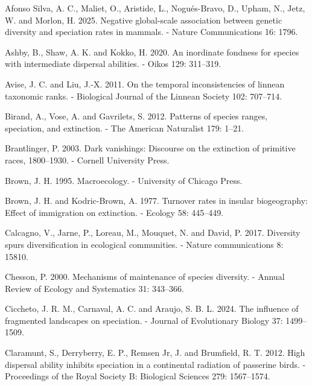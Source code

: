 \documentclass[
  letterpaper,
  DIV=11,
  numbers=noendperiod]{scrartcl}
\newlength{\cslhangindent}
\newenvironment{CSLReferences}[2] %
 {\begin{list}{}{%
  \setlength{\itemindent}{0pt}
  \setlength{\leftmargin}{0pt}
  \setlength{\parsep}{0pt}
  \ifodd #1
   \setlength{\leftmargin}{\cslhangindent}
   \setlength{\itemindent}{-1\cslhangindent}
  \fi
  \setlength{\itemsep}{#2\baselineskip}}}
 {\end{list}}
\begin{document}
\label{refs}
\begin{CSLReferences}{1}{1}
Afonso Silva, A. C., Maliet, O., Aristide, L., Nogués-Bravo, D., Upham,
N., Jetz, W. and Morlon, H. 2025. Negative global-scale association
between genetic diversity and speciation rates in mammals. - Nature
Communications 16: 1796.

Ashby, B., Shaw, A. K. and Kokko, H. 2020. An inordinate fondness for
species with intermediate dispersal abilities. - Oikos 129: 311--319.

Avise, J. C. and Liu, J.-X. 2011. On the temporal inconsistencies of
linnean taxonomic ranks. - Biological Journal of the Linnean Society
102: 707--714.

Birand, A., Vose, A. and Gavrilets, S. 2012. Patterns of species ranges,
speciation, and extinction. - The American Naturalist 179: 1--21.

Brantlinger, P. 2003. Dark vanishings: Discourse on the extinction of
primitive races, 1800--1930. - Cornell University Press.

Brown, J. H. 1995. Macroecology. - University of Chicago Press.

Brown, J. H. and Kodric-Brown, A. 1977. Turnover rates in insular
biogeography: Effect of immigration on extinction. - Ecology 58:
445--449.

Calcagno, V., Jarne, P., Loreau, M., Mouquet, N. and David, P. 2017.
Diversity spurs diversification in ecological communities. - Nature
communications 8: 15810.

Chesson, P. 2000. Mechanisms of maintenance of species diversity. -
Annual Review of Ecology and Systematics 31: 343--366.

Ciccheto, J. R. M., Carnaval, A. C. and Araujo, S. B. L. 2024. The
influence of fragmented landscapes on speciation. - Journal of
Evolutionary Biology 37: 1499--1509.

Claramunt, S., Derryberry, E. P., Remsen Jr, J. and Brumfield, R. T.
2012. High dispersal ability inhibits speciation in a continental
radiation of passerine birds. - Proceedings of the Royal Society B:
Biological Sciences 279: 1567--1574.


\end{CSLReferences}
\end{document}
